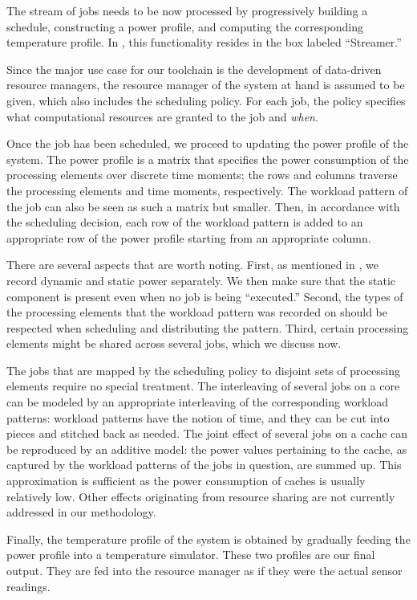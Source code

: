 The stream of jobs needs to be now processed by progressively building a
schedule, constructing a power profile, and computing the corresponding
temperature profile. In , this functionality resides in the
box labeled ``Streamer.''

Since the major use case for our toolchain is the development of data-driven
resource managers, the resource manager of the system at hand is assumed to be
given, which also includes the scheduling policy. For each job, the policy
specifies what computational resources are granted to the job and \emph{when}.

Once the job has been scheduled, we proceed to updating the power profile of the
system. The power profile is a matrix that specifies the power consumption of
the processing elements over discrete time moments; the rows and columns
traverse the processing elements and time moments, respectively. The workload
pattern of the job can also be seen as such a matrix but smaller. Then, in
accordance with the scheduling decision, each row of the workload pattern is
added to an appropriate row of the power profile starting from an appropriate
column.

There are several aspects that are worth noting. First, as mentioned in
, we record dynamic and static power separately. We then make
sure that the static component is present even when no job is being
``executed.'' Second, the types of the processing elements that the workload
pattern was recorded on should be respected when scheduling and distributing the
pattern. Third, certain processing elements might be shared across several jobs,
which we discuss now.

The jobs that are mapped by the scheduling policy to disjoint sets of processing
elements require no special treatment. The interleaving of several jobs on a
core can be modeled by an appropriate interleaving of the corresponding workload
patterns: workload patterns have the notion of time, and they can be cut into
pieces and stitched back as needed. The joint effect of several jobs on a cache
can be reproduced by an additive model: the power values pertaining to the
cache, as captured by the workload patterns of the jobs in question, are summed
up. This approximation is sufficient as the power consumption of caches is
usually relatively low. Other effects originating from resource sharing are not
currently addressed in our methodology.

Finally, the temperature profile of the system is obtained by gradually feeding
the power profile into a temperature simulator. These two profiles are our final
output. They are fed into the resource manager as if they were the actual sensor
readings.
